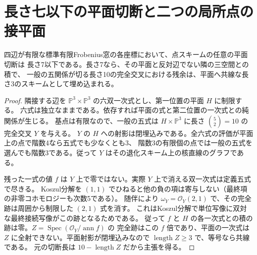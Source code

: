\section{長さ七以下の平面切断と二つの局所点の接平面}
\label{sec:finite-plane-sections-and-tangent-incidence}
\begin{theorem}\label{thm:finite-plane-section-seven}
四辺が有限な標準有限Frobenius窓の各座標において、点スキームの任意の平面切断は
長さ7以下である。長さ7なら、その平面と反対辺でない隣の三空間との積で、
一般の五関係が切る長さ10の完全交叉における残余は、平面へ共線な長さ3のスキームとして埋め込まれる。
\end{theorem}
\begin{proof}
隣接する辺を $\mathbb P^3\times\mathbb P^3$ の六双一次式とし、第一位置の平面 $H$ に制限する。
六式は独立なままである。依存すれば平面の式と第二位置の一次式との純関係が生じる。
基点は有限なので、一般の五式は $H\times\mathbb P^3$ に長さ $\binom52=10$ の完全交叉 $Y$ を与える。
$Y$ の $H$ への射影は閉埋込みである。全六式の評価が平面上の点で階数4なら五式でも少なくとも3、
階数3の有限個の点では一般の五式を選んでも階数3である。従って $Y$ はその退化スキーム上の核直線のグラフである。

残った一式の値 $f$ は $Y$ 上で零ではない。実際 $Y$ 上で消える双一次式は定義五式で尽きる。
Koszul分解を $(1,1)$ でひねると他の負の項は寄与しない（最終項の非零コホモロジーも次数5である）。
随伴により $\omega_Y=\mathcal O_Y(2,1)$ で、その完全跡は周囲から制限した $(2,1)$ 式を消す。
これはKoszul分解で単位写像に双対な最終接続写像がこの跡となるためである。
従って $f$ と $H$ の各一次式との積の跡は零。$Z=\operatorname{Spec}(\mathcal O_Y/\operatorname{ann} f)$ の
完全跡はこの $f$ 倍であり、平面の一次式は $Z$ に全射できない。平面射影が閉埋込みなので
$\operatorname{length}Z\ge3$ で、等号なら共線である。
元の切断長は $10-\operatorname{length} Z$ だから主張を得る。
\end{proof}

